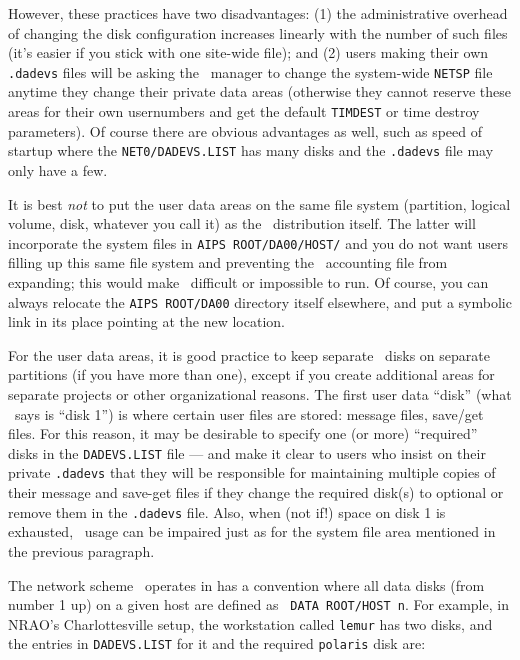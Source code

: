 However, these practices have two disadvantages: (1) the administrative
overhead of changing the disk configuration increases linearly with the
number of such files (it's easier if you stick with one site-wide file);
and (2) users making their own {\tt .dadevs} files will be asking the
\AIPS\ manager to change the system-wide {\tt NETSP} file anytime they
change their private data areas (otherwise they cannot reserve these
areas for their own usernumbers and get the default {\tt TIMDEST} or
time destroy parameters).  Of course there are obvious advantages as
well, such as speed of startup where the {\tt \dol NET0/DADEVS.LIST} has
many disks and the {\tt .dadevs} file may only have a few.

It is best {\it not\/} to put the user data areas on the same file
system (partition, logical volume, disk, whatever you call it) as the
\AIPS\ distribution itself.  The latter will incorporate the system
files in {\tt \dol AIPS ROOT/DA00/\dol HOST/} and you do not want users
filling up this same file system and preventing the \AIPS\ accounting
file from expanding; this would make \ttaips\ difficult or impossible to
run.  Of course, you can always relocate the {\tt\dol AIPS ROOT/DA00}
directory itself elsewhere, and put a symbolic link in its place
pointing at the new location.

For the user data areas, it is good practice to keep separate
\AIPS\ disks on separate partitions (if you have more than one), except
if you create additional areas for separate projects or other
organizational reasons.  The first user data ``disk'' (what
\ttaips\ says is ``disk 1'') is where certain user files are stored:
message files, save/get files.  For this reason, it may be desirable to
specify one (or more) ``required'' disks in the {\tt DADEVS.LIST} file
--- and make it clear to users who insist on their private {\tt .dadevs}
that they will be responsible for maintaining multiple copies of their
message and save-get files if they change the required disk(s) to
optional or remove them in the {\tt .dadevs} file.  Also, when (not if!)
space on disk 1 is exhausted, \AIPS\ usage can be impaired just as for
the system file area mentioned in the previous paragraph.

The network scheme \AIPS\ operates in has a convention where all data
disks (from number 1 up) on a given host are defined as {\tt
\dol DATA ROOT/\dol HOST n}.  For example, in NRAO's Charlottesville
setup, the workstation called {\tt lemur} has two disks, and the
entries in {\tt DADEVS.LIST} for it and the required {\tt polaris}
disk are:\medskip

